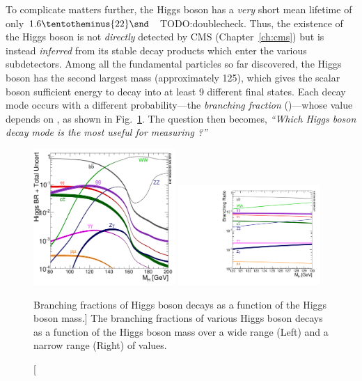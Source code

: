 To complicate matters further, the Higgs boson has a \emph{very} short mean lifetime of only $1.6 \tentotheminus{22}\snd$~\cite{particle_data_group_review_2020} TODO:doublecheck.
Thus, the existence of the Higgs boson is not \emph{directly} detected by CMS (Chapter~\ref{ch:cms}) but is instead \emph{inferred} from its stable decay products which enter the various subdetectors.
Among all the fundamental particles so far discovered, the Higgs boson has the second largest mass (approximately 125\GeV),
which gives the scalar boson sufficient energy to decay into at least 9 different final states.
Each decay mode occurs with a different probability---the \emph{branching fraction} (\br)---whose value depends on \mH, as shown in Fig.~\ref{fig:higgs_br}.
The question then becomes, \emph{``Which Higgs boson decay mode is the most useful for measuring \mH?''}
\begin{figure}[!htbp]
    \begin{center}
		\includegraphics[width=0.48\textwidth]{figures/higgsmassmeas/higgs_BR_80to200GeV.pdf}
		\includegraphics[width=0.48\textwidth]{figures/higgsmassmeas/higgs_BR_120to130GeV.pdf}
		\caption
			[Branching fractions of Higgs boson decays as a function of the Higgs boson mass.]
			{
            The branching fractions of various Higgs boson decays as a function of the Higgs boson mass
            over a wide range (Left) and a narrow range (Right) of values.
            }
		\label{fig:higgs_br}
	\end{center}
\end{figure} 
